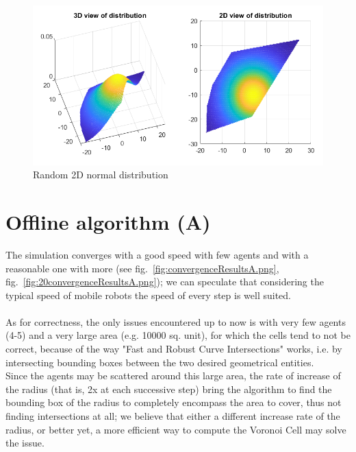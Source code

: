 \documentclass[a4paper,11pt,oneside]{book}
\begin{document}
	\begin{figure}	
		\centering	
		\includegraphics[scale=0.7]{figs/gaussianDistrib.png}
		\caption{Random 2D normal distribution}\label{fig:gaussianDistrib.png}	
	\end{figure}
	
	\section{Offline algorithm (A)}
	
	The simulation converges with a good speed with few agents and with a reasonable one with more (see fig.~\ref{fig:convergenceResultsA.png}, fig.~\ref{fig:20convergenceResultsA.png}); we can speculate that considering the typical speed of mobile robots the speed of every step is well suited.\\\\
	As for correctness, the only issues encountered up to now is with very few agents (4-5) and a very large area (e.g. 10000 sq. unit), for which the cells tend to not be correct, because of the way "Fast and Robust Curve Intersections" works, i.e. by intersecting bounding boxes between the two desired geometrical entities.\\
	Since the agents may be scattered around this large area, the rate of increase of the radius (that is, 2x at each successive step) bring the algorithm to find the bounding box of the radius to completely encompass the area to cover, thus not finding intersections at all; we believe that either a different increase rate of the radius, or better yet, a more efficient way to compute the Voronoi Cell may solve the issue.
	
\end{document}
